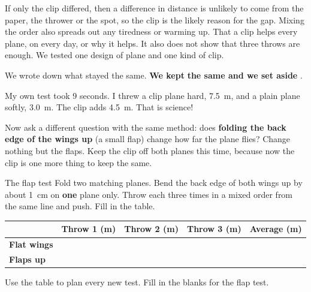 {If only the clip differed, then a difference in distance is unlikely to come from the paper, the thrower or the spot, so the clip is the likely reason for the gap. Mixing the order also spreads out any tiredness or warming up.}
{That a clip helps every plane, on every day, or why it helps. It also does not show that three throws are enough. We tested one design of plane and one kind of clip.}

\begin{keepbox}
We wrote down what stayed the same. \textbf{We kept} \wline[3.6cm] \textbf{the same and we set aside} \wline[3.2cm].
\end{keepbox}

\begin{multix}[hmm]\multixbot[hmm]\tcblower
My own test took 9 seconds. I threw a clip plane hard, 7.5~m, and a plain plane softly, 3.0~m. The clip adds 4.5~m. That is science!
\end{multix}

\clearpage

Now ask a different question with the same method: does \textbf{folding the back edge of the wings up} (a small flap) change how far the plane flies? Change nothing but the flaps. Keep the clip off both planes this time, because now the clip is one more thing to keep the same.

\begin{tryit}{The flap test}
Fold two matching planes. Bend the back edge of both wings up by about 1~cm on \textbf{one} plane only. Throw each three times in a mixed order from the same line and push. Fill in the table.\par\medskip
\renewcommand{\arraystretch}{1.6}
\begin{tabular}{|l|c|c|c|c|}
\hline
 & \textbf{Throw 1 (m)} & \textbf{Throw 2 (m)} & \textbf{Throw 3 (m)} & \textbf{Average (m)}\\ \hline
\textbf{Flat wings} & & & & \\ \hline
\textbf{Flaps up} & & & & \\ \hline
\end{tabular}
\end{tryit}

Use the table to plan every new test. Fill in the blanks for the flap test.

